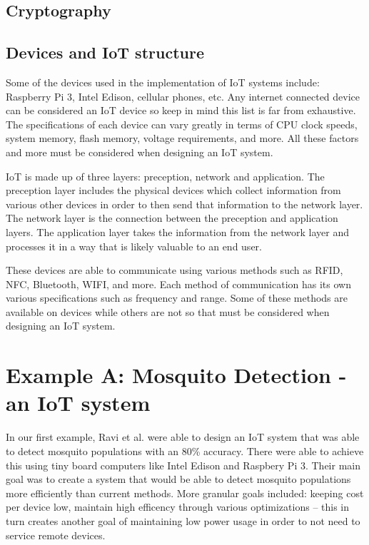 \documentclass{sig-alternate}
\begin{document}
\subsection{Cryptography}
\label{sec:cryptography}


\subsection{Devices and IoT structure}
\label{sec:devices}


Some of the devices used in the implementation of IoT systems include: Raspberry Pi 3, Intel Edison, cellular phones, etc. Any internet connected device can be considered an IoT device so keep in mind this list is far from exhaustive. The specifications of each device can vary greatly in terms of CPU clock speeds, system memory, flash memory, voltage requirements, and more. All these factors and more must be considered when designing an IoT system.

IoT is made up of three layers: preception, network and application. The preception layer includes the physical devices which collect information from various other devices in order to then send that information to the network layer. The network layer is the connection between the preception and application layers. The application layer takes the information from the network layer and processes it in a way that is likely valuable to an end user.

These devices are able to communicate using various methods such as RFID, NFC, Bluetooth, WIFI, and more. Each method of communication has its own various specifications such as frequency and range. Some of these methods are available on devices while others are not so that must be considered when designing an IoT system.


\section{Example A: Mosquito Detection - an IoT system}
\label{sec:mosquito}

In our first example, Ravi et al. were able to design an IoT system that was able to detect mosquito populations with an 80\% accuracy. There were able to achieve this using tiny board computers like Intel Edison and Raspbery Pi 3. Their main goal was to create a system that would be able to detect mosquito populations more efficiently than current methods. More granular goals included: keeping cost per device low, maintain high efficency through various optimizations -- this in turn creates another goal of maintaining low power usage in order to not need to service remote devices.
\end{document}
